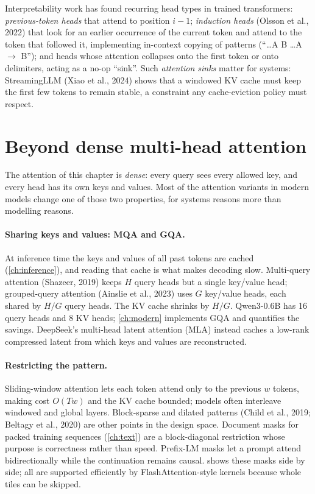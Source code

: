 \begin{deepdive}
Interpretability work has found recurring head types in trained transformers: \emph{previous-token
heads} that attend to position $i-1$; \emph{induction heads} (Olsson et al., 2022) that look for an
earlier occurrence of the current token and attend to the token that followed it, implementing
in-context copying of patterns (``\dots A B \dots A $\to$ B''); and heads whose attention collapses
onto the first token or onto delimiters, acting as a no-op ``sink''. Such \emph{attention sinks}
matter for systems: StreamingLLM (Xiao et al., 2024) shows that a windowed KV cache must keep the
first few tokens to remain stable, a constraint any cache-eviction policy must respect.
\end{deepdive}

\section{Beyond dense multi-head attention}\label{sec:attention:variants}

The attention of this chapter is \emph{dense}: every query sees every allowed key, and every head has
its own keys and values. Most of the attention variants in modern models change one of those two
properties, for systems reasons more than modelling reasons.

\paragraph{Sharing keys and values: MQA and GQA.} At inference time the keys and values of all past
tokens are cached (\cref{ch:inference}), and reading that cache is what makes decoding slow.
Multi-query attention (Shazeer, 2019) keeps $H$ query heads but a single key/value head; grouped-query
attention (Ainslie et al., 2023) uses $G$ key/value heads, each shared by $H/G$ query heads. The
KV cache shrinks by $H/G$. Qwen3-0.6B has 16 query heads and 8 KV heads; \cref{ch:modern} implements
GQA and quantifies the savings. DeepSeek's multi-head latent attention (MLA) instead caches a
low-rank compressed latent from which keys and values are reconstructed.

\paragraph{Restricting the pattern.} Sliding-window attention lets each token attend only to the
previous $w$ tokens, making cost $O(Tw)$ and the KV cache bounded; models often interleave windowed
and global layers. Block-sparse and dilated patterns (Child et al., 2019; Beltagy et al., 2020) are
other points in the design space. Document masks for packed training sequences
(\cref{ch:text}) are a block-diagonal restriction whose purpose is correctness rather than speed.
Prefix-LM masks let a prompt attend bidirectionally while the continuation remains causal.
 shows these masks side by side; all are supported efficiently by
FlashAttention-style kernels because whole tiles can be skipped.

